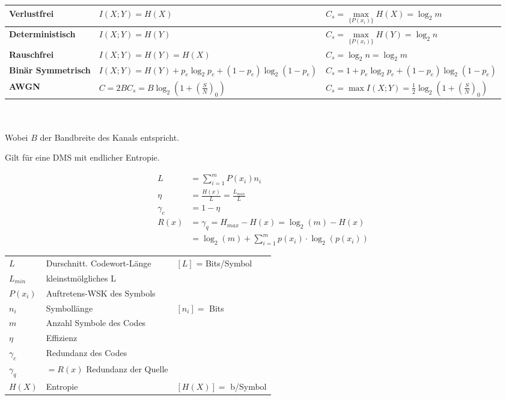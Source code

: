 	\renewcommand{\arraystretch}{2}
	\begin{tabular}{| p{3.5cm} | p{7.5cm} | p{6.5cm} |}
		\hline  
    		\textbf{Verlustfrei}
    			& $ I(X; Y) = H(X) $
    			& $ C_s = \max\limits_{\{ P(x_i) \}}{H (X)} = \log_2 m $ \\
		\hline
    		\textbf{Deterministisch}
    			& $ I(X; Y) = H(Y) $
    			& $ C_s = \max\limits_{\{ P(x_i) \}}{H (Y)} = \log_2 n $ \\
		\hline
    		\textbf{Rauschfrei}
    			& $ I(X; Y) = H(Y) = H(X)$
    			& $ C_s = \log_2 n = \log_2 m$ \\
		\hline
    		\textbf{Binär Symmetrisch}
    			& $ I(X; Y) = H(Y) + p_e \log_2 p_e + (1-p_e) \log_2 (1-p_e)$
    			& $ C_s = 1 + p_e \log_2 p_e + (1-p_e) \log_2 (1-p_e)$ \\
		\hline
    		\textbf{AWGN}
    			& $ C = 2 B C_s = B \log_2 (1 + \left(\frac{S}{N}\right)_0)$ 
    			& $ C_s = \max{I(X; Y) = \frac{1}{2} \log_2 (1 + \left(\frac{S}{N}\right)_0)}$ \\
		\hline
 	\end{tabular}
	\renewcommand{\arraystretch}{1} \\ \\
Wobei $B$ der Bandbreite des Kanals entspricht. 


Gilt für eine DMS mit endlicher Entropie.
\begin{multicols}{2}
	\abovedisplayskip=-15pt %
	\begin{align*}
		L 		 &= \sum\limits_{i=1}^m P(x_i) n_i \\
		\eta	 &= \frac{H(x)}{L} = \frac{L_{min}}{L} \\
		\gamma_c &= 1 - \eta \\
		R(x)	 &= \gamma_q = H_{max} - H(x) = \log_2(m) - H(x) \\
				 &= \log_2(m) + \sum\limits_{i = 1}^m p(x_i) \cdot \log_2( p(x_i))
	\end{align*}
	
	\begin{tabular}{lll}
		$L$ 		& Durschnitt. Codewort-Länge & $[L]$ = Bits/Symbol \\
		$L_{min}$ 	& kleinstmölgliches L &  \\
		$P(x_i)$	& Auftretens-WSK des Symbols \\
		$n_i$ 		& Symbollänge & $[n_i] = $ Bits \\
		$m$ 		& Anzahl Symbole des Codes \\
		$\eta$ 		& Effizienz \\
		$\gamma_c$  & Redundanz des Codes & \\
		$\gamma_q$ 	& $= R(x)$ Redundanz der Quelle \\
		$H(X)$ 		& Entropie &  $[H(X)] = $ b/Symbol 
	\end{tabular}
\end{multicols}

